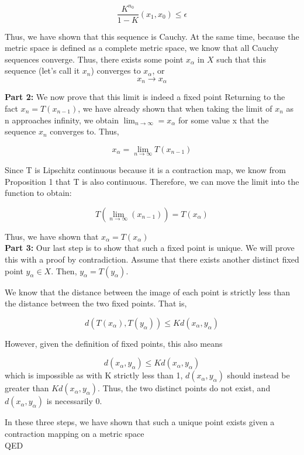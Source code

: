 \documentclass{article}
\begin{document}
$$\frac{K^{n_0}}{1-K}(x_1, x_0) \leq \epsilon$$

Thus, we have shown that this sequence is Cauchy. At the same time, because the metric space is defined as a complete metric space, we know that all Cauchy sequences converge. Thus, there exists some point $x_{\alpha}$ in $X$ such that this sequence (let's call it $x_n$) converges to $x_{\alpha}$, or $$x_n \to x_{\alpha}$$

\textbf{Part 2:} We now prove that this limit is indeed a fixed point
Returning to the fact $x_{n} = T(x_{n-1})$, we have already shown that when taking the limit of $x_{n}$ as n approaches infinity, we obtain $\lim_{n \to \infty} = x_{\alpha}$ for some value x that the sequence $x_n$ converges to. Thus,

$$x_{\alpha} = \lim_{n \to \infty} T(x_{n-1}) $$

Since T is Lipschitz continuous because it is a contraction map, we know from Proposition 1 that T is also continuous. Therefore, we can move the limit into the function to obtain:


$$ T(\lim_{n \to \infty}(x_{n-1})) = T(x_{\alpha}) $$

Thus, we have shown that $x_\alpha = T(x_\alpha)$ \\

\textbf{Part 3:} Our last step is to show that such a fixed point is unique. We will prove this with a proof by contradiction. Assume that there exists another distinct fixed point $y_{\alpha} \in X$. Then, $y_{\alpha} = T(y_{\alpha})$.

We know that the distance between the image of each point is strictly less than the distance between the two fixed points. That is,

$$d(T(x_{\alpha}), T(y_{\alpha})) \leq Kd(x_{\alpha}, y_{\alpha})$$



However, given the definition of fixed points, this also means

$$d(x_{\alpha}, y_{\alpha}) \leq Kd(x_{\alpha}, y_{\alpha})$$
which is impossible as with K  strictly less than 1, $d(x_{\alpha}, y_{\alpha})$ should instead be greater than $Kd(x_{\alpha}, y_{\alpha})$. Thus, the two distinct points do not exist, and $d(x_{\alpha}, y_{\alpha})$ is necessarily 0.

In these three steps, we have shown that such a unique point exists given a contraction mapping on a metric space \\
QED \\
\end{document}
